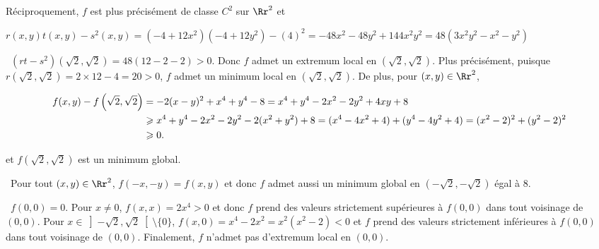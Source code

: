 {\begin{enumerate}
{Réciproquement, $f$ est plus précisément de classe $C^2$ sur $\Rr^2$ et

\begin{center}
$r(x,y)t(x,y)-s^2(x,y)=(-4+12x^2)(-4+12y^2)-(4)^2=-48x^2-48y^2+144x^2y^2=48(3x^2y^2-x^2-y^2)$
\end{center}

\textbullet~$(rt-s^2)\left(\sqrt{2},\sqrt{2}\right)=48(12-2-2)>0$. Donc $f$ admet un extremum local en $\left(\sqrt{2},\sqrt{2}\right)$. Plus précisément, puisque $r\left(\sqrt{2},\sqrt{2}\right)=2\times12-4=20>0$, $f$ admet un minimum local en $\left(\sqrt{2},\sqrt{2}\right)$. De plus, pour $(x,y)\in\Rr^2$,

\begin{align*}\ensuremath
f(x,y)-f\left(\sqrt{2},\sqrt{2}\right)&=-2(x-y)^2+x^4+y^4-8=x^4+y^4-2x^2-2y^2+4xy+8\\
 &\geqslant x^4+y^4-2x^2-2y^2-2(x^2+y^2)+8=(x^4-4x^2+4)+(y^4-4y^2+4)=(x^2-2)^2+(y^2-2)^2\\
 &\geqslant0.
\end{align*}

et $f\left(\sqrt{2},\sqrt{2}\right)$ est un minimum global.

\textbullet~Pour tout $(x,y)\in\Rr^2$, $f(-x,-y)=f(x,y)$ et donc $f$ admet aussi un minimum global en $\left(-\sqrt{2},-\sqrt{2}\right)$ égal à $8$.

\textbullet~$f(0,0)=0$. Pour $x\neq0$, $f(x,x)=2x^4>0$ et donc $f$ prend des valeurs strictement supérieures à $f(0,0)$ dans tout voisinage de $(0,0)$. Pour $x\in\left]-\sqrt{2},\sqrt{2}\right[\setminus\{0\}$, $f(x,0)=x^4-2x^2=x^2(x^2-2)<0$ et $f$ prend des valeurs strictement inférieures à $f(0,0)$ dans tout voisinage de $(0,0)$. Finalement, $f$ n'admet pas d'extremum local en $(0,0)$.

\begin{center}
\end{center}}
\end{enumerate}
}
